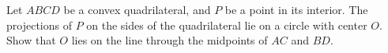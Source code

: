 Let $ABCD$ be a convex quadrilateral, and $P$ be a point in its interior. The projections of $P$ on the sides of the quadrilateral lie on a circle with center $O$. Show that $O$ lies on the line through the midpoints of $AC$ and $BD$.